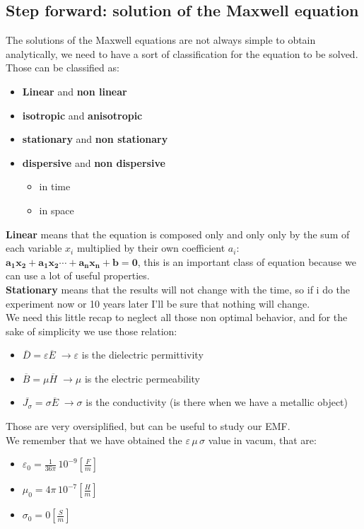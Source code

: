 \subsection*{Step forward: solution of the Maxwell equation}
The solutions of the Maxwell equations are not always simple to obtain analytically, we need to have a sort of classification for the equation to be solved. Those can be classified as:
\begin{itemize}
\item \textbf{Linear} and \textbf{non linear}
\item \textbf{isotropic} and \textbf{anisotropic}
\item \textbf{stationary} and \textbf{non stationary}
\item \textbf{dispersive} and \textbf{non dispersive}
\begin{itemize}
\item in time
\item in space
\end{itemize}
\end{itemize}
\textbf{Linear} means that the equation is composed only and only only by the sum of each variable $x_i$ multiplied by their own coefficient $a_i$: $\bm{a_1x_2+a_1x_2\cdots + a_nx_n+b=0}$, this is an important class of equation because we can use a lot of useful properties.\\
\textbf{Stationary} means that the results will not change with the time, so if i do the experiment now or 10 years later I'll be sure that nothing will change.\\
We need this little recap to neglect all those non optimal behavior, and for the sake of simplicity we use those relation:
\begin{itemize}
    \item $\overline{D}=\varepsilon \overline{E}\;\rightarrow \varepsilon$ is the dielectric permittivity
    \item $\overline{B}=\mu \overline{H}\;\rightarrow \mu$ is the electric permeability
    \item $\overline{J_\sigma}=\sigma \overline{E}\;\rightarrow \sigma$ is the conductivity (is there when we have a metallic object)
\end{itemize}
Those are very oversiplified, but can be useful to study our EMF.\\
We remember that we have obtained the $\varepsilon \, \mu \, \sigma$ value in vacum, that are:
\begin{itemize}
    \item $\varepsilon_0=\frac{1}{36\pi}\,10^{-9} \left[\frac{F}{m}\right]$
    \item $\mu_0=4\pi\,10^{-7} \left[\frac{H}{m}\right]$
    \item $\sigma_0=0 \left[\frac{S}{m}\right]$
\end{itemize}
